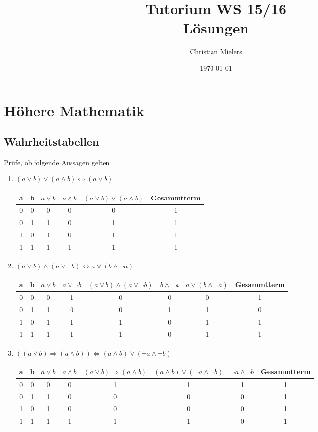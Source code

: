 \documentclass[11pt, a4paper]{article}
\title{Tutorium WS 15/16 \\ Lösungen}
\author{Christian Mielers}
\date{\today}
\begin{document}
\maketitle
\tableofcontents	

\newpage
\section{Höhere Mathematik}
\subsection{Wahrheitstabellen}
Prüfe, ob folgende Aussagen gelten

\begin{enumerate}
	\item $(a \lor b) \lor (a \land b) \Leftrightarrow (a \lor b)$

	\begin{tabular}{|c|c||c|c|c||c|}
		\hline
		a & b & $a \lor b$ & $a \land b$ & $(a \lor b) \lor (a \land b)$ & Gesammtterm \vphantom{\Big(}\\
		\hline
		0 & 0 & 0 & 0 & 0 & 1 \\
		0 & 1 & 1 & 0 & 1 & 1 \\
		1 & 0 & 1 & 0 & 1 & 1 \\
		1 & 1 & 1 & 1 & 1 & 1 \\
	   \hline
	\end{tabular}

	\item $(a \lor b) \land (a \lor \lnot b) \Leftrightarrow a \lor (b \land \lnot a)$

	\begin{tabular}{|c|c||c|c|c||c|c||c|}
		\hline
		a & b & $a \lor b$ & $a \lor \lnot b$ & $(a \lor b) \land (a \lor \lnot b)$ &
		$b \land \lnot a$ & $a \lor (b \land \lnot a)$ & Gesammtterm \vphantom{\Big(} \\
		\hline
		0 & 0 & 0 & 1 & 0 & 0 & 0 & 1 \\
		0 & 1 & 1 & 0 & 0 & 1 & 1 & 0 \\
		1 & 0 & 1 & 1 & 1 & 0 & 1 & 1 \\
		1 & 1 & 1 & 1 & 1 & 0 & 1 & 1 \\
	  \hline
	\end{tabular}

	\item $\left((a \lor b) \Rightarrow (a \land b) \right) \Leftrightarrow (a \land b) \lor (\lnot a \land \lnot b)$

	\begin{tabular}{|c|c||c|c|c||c|c||c|}
		\hline
		a & b & $a \lor b$ & $a \land b$ & $(a \lor b) \Rightarrow (a \land b)$ &
		$(a \land b) \lor (\lnot a \land \lnot b)$ & $\lnot a \land \lnot b$ & Gesammtterm \vphantom{\Big(} \\
		\hline
		0 & 0 & 0 & 0 & 1 & 1 & 1 & 1 \\
		0 & 1 & 1 & 0 & 0 & 0 & 0 & 1 \\
		1 & 0 & 1 & 0 & 0 & 0 & 0 & 1 \\
		1 & 1 & 1 & 1 & 1 & 1 & 0 & 1 \\
	  \hline
	\end{tabular}
\end{enumerate}
\end{document}
